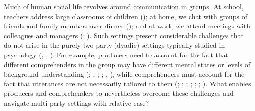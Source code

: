 \documentclass[
  english,
]{article}
\begin{document}
Much of human social life revolves around communication in groups.
At school, teachers address large classrooms of children (); at home, we chat with groups of friends and family members over dinner (); and at work, we attend meetings with colleagues and managers (; ).
Such settings present considerable challenges that do not arise in the purely two-party (dyadic) settings typically studied in psychology (; ; ).
For example, producers need to account for the fact that different comprehenders in the group may have different mental states or levels of background understanding (; ; ; ; , ), while comprehenders must account for the fact that utterances are not necessarily tailored to them (; ; ; ; ; ; ).
What enables producers and comprehenders to nevertheless overcome these challenges and navigate multi-party settings with relative ease?
\end{document}
